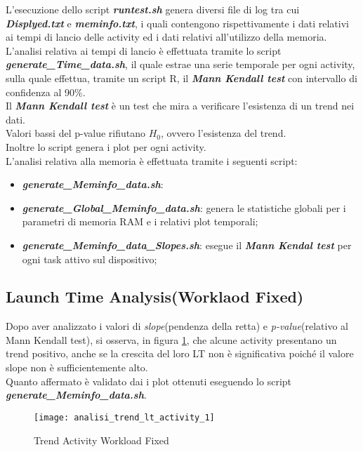 L'esecuzione dello script \textbf{\textit{runtest.sh}} genera diversi file di log
tra cui \textit{\textbf{Displyed.txt}} e \textit{\textbf{meminfo.txt}}, i quali
contengono rispettivamente i dati relativi ai tempi di lancio delle activity ed
i dati relativi all'utilizzo della memoria.\\
L'analisi relativa ai tempi di lancio è effettuata tramite lo script \textbf{\textit{generate\_Time\_data.sh}},
il quale estrae una serie temporale per ogni activity, sulla quale effettua,
tramite un script R, il \textbf{\textit{Mann Kendall test}} con intervallo
di confidenza al 90\%.\\
Il \textbf{\textit{Mann Kendall test}} è un test che mira a verificare l'esistenza
di un trend nei dati.\\
Valori bassi del p-value rifiutano $H_0$, ovvero l'esistenza del trend.\\
Inoltre lo script genera i plot per ogni activity.\\
L'analisi relativa alla memoria è effettuata tramite i seguenti script:
\begin{itemize}
  \item \textit{\textbf{generate\_Meminfo\_data.sh}}:
  \item \textit{\textbf{generate\_Global\_Meminfo\_data.sh}}: genera le statistiche
  globali per i parametri di memoria RAM e i relativi plot temporali;
  \item \textit{\textbf{generate\_Meminfo\_data\_Slopes.sh}}: esegue il \textbf{\textit{Mann Kendal test}}
  per ogni task attivo sul dispositivo;
\end{itemize}

\clearpage

\subsection{Launch Time Analysis(Worklaod Fixed)}
Dopo aver analizzato i valori di \textit{slope}(pendenza della retta) e
\textit{p-value}(relativo al Mann Kendall test), si osserva, in figura \ref{and_analisi_trend_lt_activity_1},
che alcune activity presentano un trend positivo, anche se la crescita
del loro LT non è significativa poiché il valore slope non è sufficientemente
alto.\\
Quanto affermato è validato dai i plot ottenuti eseguendo lo script
\textit{\textbf{generate\_Meminfo\_data.sh}}.

\begin{figure}[!htbp]
  \centering
  \texttt{[image: analisi\_trend\_lt\_activity\_1]}
  \caption{Trend Activity Workload Fixed}
  \label{and_analisi_trend_lt_activity_1}
\end{figure}

